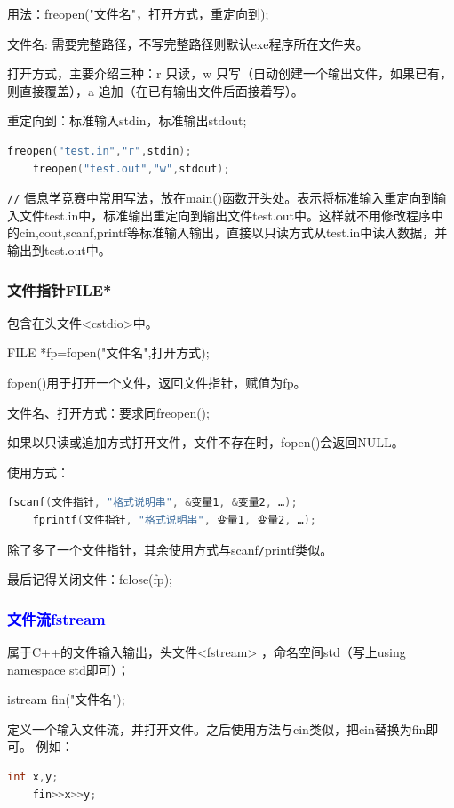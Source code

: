 \documentclass[UTF8]{ctexart}
\begin{document}
用法：freopen("文件名"，打开方式，重定向到);

文件名: 需要完整路径，不写完整路径则默认exe程序所在文件夹。

打开方式，主要介绍三种：r 只读，w 只写（自动创建一个输出文件，如果已有，则直接覆盖），a 追加（在已有输出文件后面接着写）。

重定向到：标准输入stdin，标准输出stdout;
\begin{lstlisting}[language = C,basicstyle=\small\ttfamily]
    freopen("test.in","r",stdin);
    freopen("test.out","w",stdout);
\end{lstlisting}
\verb|//| 信息学竞赛中常用写法，放在main()函数开头处。表示将标准输入重定向到输入文件test.in中，标准输出重定向到输出文件test.out中。这样就不用修改程序中的cin,cout,scanf,printf等标准输入输出，直接以只读方式从test.in中读入数据，并输出到test.out中。

\subsubsection{文件指针FILE*}
包含在头文件<cstdio>中。

FILE *fp=fopen("文件名",打开方式);

fopen()用于打开一个文件，返回文件指针，赋值为fp。

文件名、打开方式：要求同freopen();

如果以只读或追加方式打开文件，文件不存在时，fopen()会返回NULL。

使用方式：
\begin{lstlisting}[language = C,basicstyle=\small\ttfamily]
    fscanf(文件指针, "格式说明串", &变量1, &变量2, …);
    fprintf(文件指针, "格式说明串", 变量1, 变量2, …);
\end{lstlisting}
除了多了一个文件指针，其余使用方式与scanf\verb|/|printf类似。

最后记得关闭文件：fclose(fp);

\subsubsection{\textcolor{blue}{文件流fstream}}
属于C++的文件输入输出，头文件<fstream> ，命名空间std（写上using namespace std即可）；

istream fin("文件名");

定义一个输入文件流，并打开文件。之后使用方法与cin类似，把cin替换为fin即可。
例如：
\begin{lstlisting}[language = C,basicstyle=\small\ttfamily]
    int x,y;
    fin>>x>>y;
\end{lstlisting}
\end{document}
